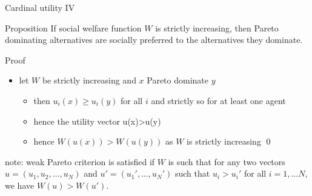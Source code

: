 \documentclass[bigger]{beamer}
\begin{document}
\begin{frame}[label={sec:orgeac1a18}]{Cardinal utility IV}
\begin{block}{Proposition}
If social welfare function \(W\) is strictly increasing, then Pareto dominating alternatives are socially preferred to the alternatives they dominate.
\end{block}
\begin{block}{Proof}
\begin{itemize}
\item let \(W\) be strictly increasing and \(x\) Pareto dominate \(y\)
\begin{itemize}
\item then \(u_i(x)\geq u_i(y)\) for all \(i\) and strictly so for at least one agent
\item hence the utility vector u(x)>u(y)
\item hence \(W(u(x))> W(u(y))\) as \(W\) is strictly increasing \qed
\end{itemize}
\end{itemize}
\end{block}
note: \alert{weak} Pareto criterion is satisfied if \(W\) is such that for any two vectors \(u=(u_1, u_2,\dots,u_N)\) and \(u'=(u_1',\dots,u_N')\) such that \(u_i>u_i'\) for all \(i=1,\dots N\), we have \(W(u)>W(u')\).
\end{frame}
\end{document}
